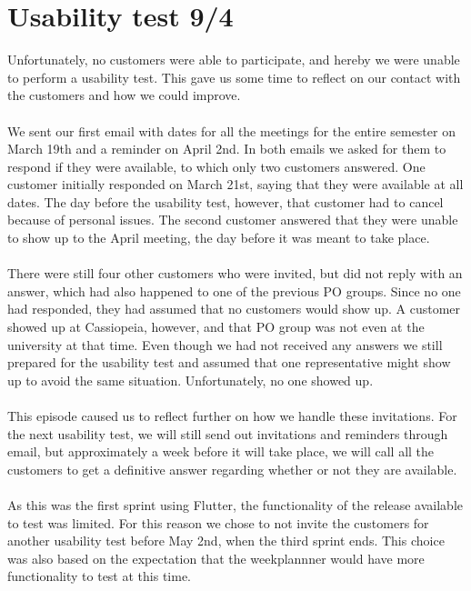 \section{Usability test 9/4}\label{sprint-2-usability-test}
Unfortunately, no customers were able to participate, and hereby we were unable to perform a usability test.
This gave us some time to reflect on our contact with the customers and how we could improve.
\\\\
We sent our first email with dates for all the meetings for the entire semester on March 19th and a reminder on April 2nd.
In both emails we asked for them to respond if they were available, to which only two customers answered. 
One customer initially responded on March 21st, saying that they were available at all dates. 
The day before the usability test, however, that customer had to cancel because of personal issues.
The second customer answered that they were unable to show up to the April meeting, the day before it was meant to take place.
\\\\
There were still four other customers who were invited, but did not reply with an answer, which had also happened to one of the previous PO groups.
Since no one had responded, they had assumed that no customers would show up.
A customer showed up at Cassiopeia, however, and that PO group was not even at the university at that time. 
Even though we had not received any answers we still prepared for the usability test and assumed that one representative might show up to avoid the same situation.
Unfortunately, no one showed up.
\\\\
This episode caused us to reflect further on how we handle these invitations.
For the next usability test, we will still send out invitations and reminders through email, but approximately a week before it will take place, we will call all the customers to get a definitive answer regarding whether or not they are available. 
\\\\
As this was the first sprint using Flutter, the functionality of the release available to test was limited. 
For this reason we chose to not invite the customers for another usability test before May 2nd, when the third sprint ends.
This choice was also based on the expectation that the weekplannner would have more functionality to test at this time.
